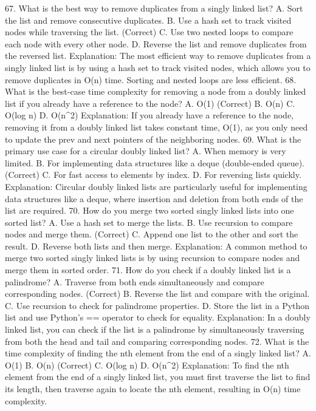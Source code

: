 67. What is the best way to remove duplicates from a singly linked list?
A. Sort the list and remove consecutive duplicates.
B. Use a hash set to track visited nodes while traversing the list. (Correct)
C. Use two nested loops to compare each node with every other node.
D. Reverse the list and remove duplicates from the reversed list.
Explanation: The most efficient way to remove duplicates from a singly linked list is by using a hash set to track visited nodes, which allows you to remove duplicates in O(n) time. Sorting and nested loops are less efficient.
68. What is the best-case time complexity for removing a node from a doubly linked list if you already have a reference to the node?
A. O(1) (Correct)
B. O(n)
C. O(log n)
D. O(n^2)
Explanation: If you already have a reference to the node, removing it from a doubly linked list takes constant time, O(1), as you only need to update the prev and next pointers of the neighboring nodes.
69. What is the primary use case for a circular doubly linked list?
A. When memory is very limited.
B. For implementing data structures like a deque (double-ended queue). (Correct)
C. For fast access to elements by index.
D. For reversing lists quickly.
Explanation: Circular doubly linked lists are particularly useful for implementing data structures like a deque, where insertion and deletion from both ends of the list are required.
70. How do you merge two sorted singly linked lists into one sorted list?
A. Use a hash set to merge the lists.
B. Use recursion to compare nodes and merge them. (Correct)
C. Append one list to the other and sort the result.
D. Reverse both lists and then merge.
Explanation: A common method to merge two sorted singly linked lists is by using recursion to compare nodes and merge them in sorted order.
71. How do you check if a doubly linked list is a palindrome?
A. Traverse from both ends simultaneously and compare corresponding nodes. (Correct)
B. Reverse the list and compare with the original.
C. Use recursion to check for palindrome properties.
D. Store the list in a Python list and use Python's == operator to check for equality.
Explanation: In a doubly linked list, you can check if the list is a palindrome by simultaneously traversing from both the head and tail and comparing corresponding nodes.
72. What is the time complexity of finding the nth element from the end of a singly linked list?
A. O(1)
B. O(n) (Correct)
C. O(log n)
D. O(n^2)
Explanation: To find the nth element from the end of a singly linked list, you must first traverse the list to find its length, then traverse again to locate the nth element, resulting in O(n) time complexity.

